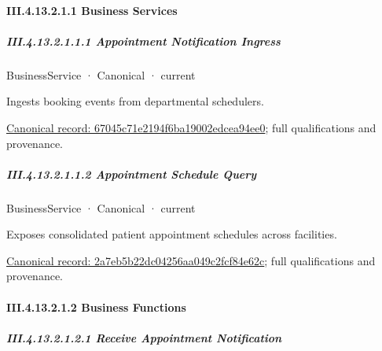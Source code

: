\paragraph*{III.4.13.2.1.1 Business Services}
\label{navigation:III.4.13.2.1.1}

\subparagraph*{III.4.13.2.1.1.1 Appointment Notification Ingress}
\label{navigation:III.4.13.2.1.1.1}

\label{element:67045c71e2194f6ba19002edcea94ee0}
{\small BusinessService · Canonical · current}\par

Ingests booking events from departmental schedulers.


{\footnotesize \href{../../../../../../../../continuum/business/business-service/67045c71e2194f6ba19002edcea94ee0.md}{Canonical record: 67045c71e2194f6ba19002edcea94ee0}; full qualifications and provenance.}\par
\subparagraph*{III.4.13.2.1.1.2 Appointment Schedule Query}
\label{navigation:III.4.13.2.1.1.2}

\label{element:2a7eb5b22dc04256aa049c2fcf84e62c}
{\small BusinessService · Canonical · current}\par

Exposes consolidated patient appointment schedules across facilities.


{\footnotesize \href{../../../../../../../../continuum/business/business-service/2a7eb5b22dc04256aa049c2fcf84e62c.md}{Canonical record: 2a7eb5b22dc04256aa049c2fcf84e62c}; full qualifications and provenance.}\par
\paragraph*{III.4.13.2.1.2 Business Functions}
\label{navigation:III.4.13.2.1.2}

\subparagraph*{III.4.13.2.1.2.1 Receive Appointment Notification}
\label{navigation:III.4.13.2.1.2.1}

